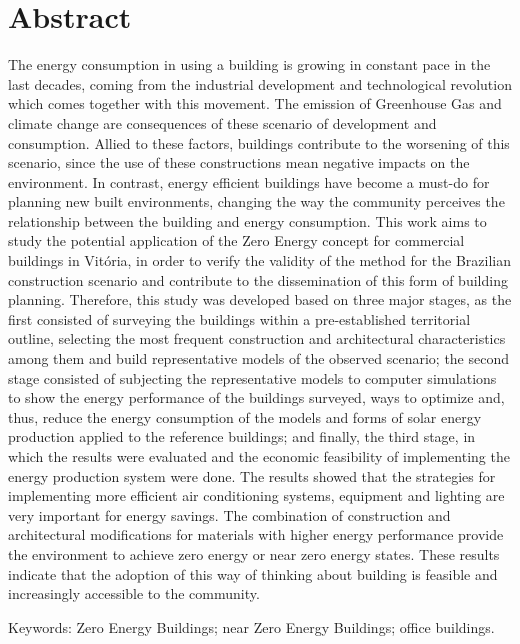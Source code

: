 \section*{Abstract}
\vspace*{1.5cm} %
\thispagestyle{empty}
\begin{onehalfspace}
    \noindent The energy consumption in using a building is growing in constant pace in the last decades, coming from the industrial development and technological revolution which comes together with this movement. The emission of Greenhouse Gas and climate change are consequences of these scenario of development and consumption. Allied to these factors, buildings contribute to the worsening of this scenario, since the use of these constructions mean negative impacts on the environment. In contrast, energy efficient buildings have become a must-do for planning new built environments, changing the way the community perceives the relationship between the building and energy consumption. This work aims to study the potential application of the Zero Energy concept for commercial buildings in Vitória, in order to verify the validity of the method for the Brazilian construction scenario and contribute to the dissemination of this form of building planning. Therefore, this study was developed based on three major stages, as the first consisted of surveying the buildings within a pre-established territorial outline, selecting the most frequent construction and architectural characteristics among them and build representative models of the observed scenario; the second stage consisted of subjecting the representative models to computer simulations to show the energy performance of the buildings surveyed, ways to optimize and, thus, reduce the energy consumption of the models and forms of solar energy production applied to the reference buildings; and finally, the third stage, in which the results were evaluated and the economic feasibility of implementing the energy production system were done. The results showed that the strategies for implementing more efficient air conditioning systems, equipment and lighting are very important for energy savings. The combination of construction and architectural modifications for materials with higher energy performance provide the environment to achieve zero energy or near zero energy states. These results indicate that the adoption of this way of thinking about building is feasible and increasingly accessible to the community.\par \vspace*{0.5cm}
    \noindent Keywords: Zero Energy Buildings; near Zero Energy Buildings; office buildings.
\end{onehalfspace}
\pagebreak